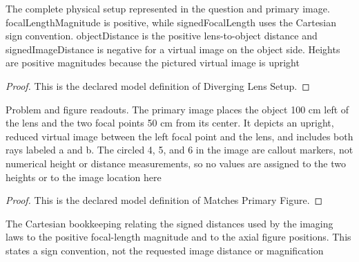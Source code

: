 \begin{definition}
  \label{def:physics:phyx-mini-0053:phyxminiproblems-problemphyxmini0053-diverginglenssetup}
  The complete physical setup represented in the question and primary image. focalLengthMagnitude is positive, while signedFocalLength uses the Cartesian sign convention. objectDistance is the positive lens-to-object distance and signedImageDistance is negative for a virtual image on the object side. Heights are positive magnitudes because the pictured virtual image is upright
\end{definition}
\begin{proof}
  This is the declared model definition of Diverging Lens Setup.
\end{proof}
\begin{definition}
  \label{def:physics:phyx-mini-0053:phyxminiproblems-problemphyxmini0053-matchesprimaryfigure}
  Problem and figure readouts. The primary image places the object 100 cm left of the lens and the two focal points 50 cm from its center. It depicts an upright, reduced virtual image between the left focal point and the lens, and includes both rays labeled a and b. The circled 4, 5, and 6 in the image are callout markers, not numerical height or distance measurements, so no values are assigned to the two heights or to the image location here
\end{definition}
\begin{proof}
  This is the declared model definition of Matches Primary Figure.
\end{proof}
\begin{definition}
  \label{def:physics:phyx-mini-0053:phyxminiproblems-problemphyxmini0053-usescartesiansignconvention}
  The Cartesian bookkeeping relating the signed distances used by the imaging laws to the positive focal-length magnitude and to the axial figure positions. This states a sign convention, not the requested image distance or magnification
\end{definition}
